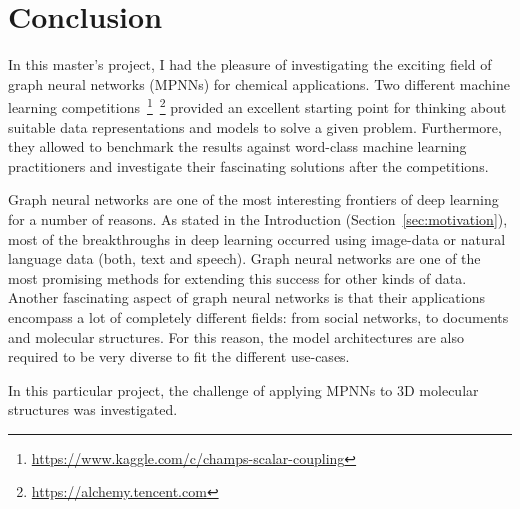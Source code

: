 \chapter{Conclusion}
\label{chapter:Conclusion}

In this master's project, I had the pleasure of investigating the exciting field of graph neural networks (MPNNs) for chemical applications. Two different machine learning competitions~\footnote{\url{https://www.kaggle.com/c/champs-scalar-coupling}}~\footnote{\url{https://alchemy.tencent.com}} provided an excellent starting point for thinking about suitable data representations and models to solve a given problem. Furthermore, they allowed to benchmark the results against word-class machine learning practitioners and investigate their fascinating solutions after the competitions.

Graph neural networks are one of the most interesting frontiers of deep learning for a number of reasons. As stated in the Introduction (Section~\ref{sec:motivation}), most of the breakthroughs in deep learning occurred using image-data or natural language data (both, text and speech). Graph neural networks are one of the most promising methods for extending this success for other kinds of data. Another fascinating aspect of graph neural networks is that their applications encompass a lot of completely different fields: from social networks, to documents and molecular structures. For this reason, the model architectures are also required to be very diverse to fit the different use-cases.

In this particular project, the challenge of applying MPNNs to 3D molecular structures was investigated. 